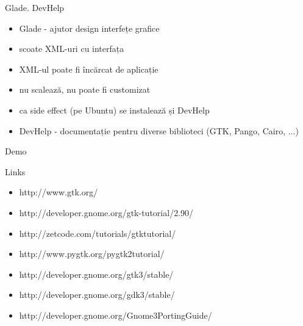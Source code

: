 \documentclass{beamer}
\begin{document}
\begin{frame}{Glade. DevHelp}
  \begin{itemize}
    \item Glade - ajutor design interfețe grafice
    \item scoate XML-uri cu interfața
    \item XML-ul poate fi încărcat de aplicație
    \item nu scalează, nu poate fi customizat
  \pause
    \item ca side effect (pe Ubuntu) se instalează și DevHelp
    \item DevHelp - documentație pentru diverse biblioteci (GTK, Pango, Cairo, ...)
  \end{itemize}
\end{frame}

\begin{frame}{Demo}
\end{frame}

\begin{frame}{Links}
  \begin{itemize}
    \item http://www.gtk.org/
    \item http://developer.gnome.org/gtk-tutorial/2.90/
    \item http://zetcode.com/tutorials/gtktutorial/
    \item http://www.pygtk.org/pygtk2tutorial/
    \item http://developer.gnome.org/gtk3/stable/
    \item http://developer.gnome.org/gdk3/stable/
    \item http://developer.gnome.org/Gnome3PortingGuide/
  \end{itemize}
\end{frame}
\end{document}
